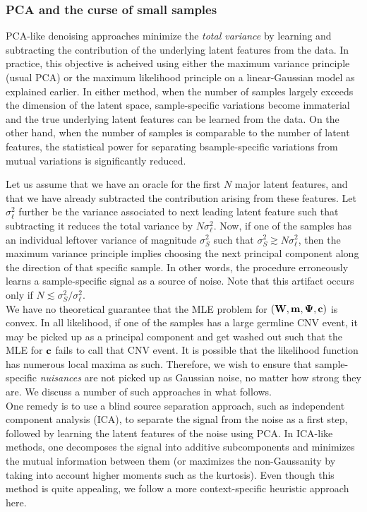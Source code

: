 \documentclass[nofootinbib,amssymb,amsmath]{revtex4}
\newcommand{\vc}{{\bf c}}
\newcommand{\vm}{{\bf m}}
\newcommand{\vW}{{\bf W}}
\newcommand{\vPsi}{{\bf \Psi}}
\begin{document}
\subsubsection{PCA and the curse of small samples}
PCA-like denoising approaches minimize the {\em total variance} by learning and subtracting the contribution of the underlying latent features from the data. In practice, this objective is acheived using either the maximum variance principle (usual PCA) or the maximum likelihood principle on a linear-Gaussian model as explained earlier. In either method, when the number of samples largely exceeds the dimension of the latent space, sample-specific variations become immaterial and the true underlying latent features can be learned from the data. On the other hand, when the number of samples is comparable to the number of latent features, the statistical power for separating bsample-specific variations from mutual variations is significantly reduced.

Let us assume that we have an oracle for the first $N$ major latent features, and that we have already subtracted the contribution arising from these features. Let $\sigma_\ell^2$ further be the variance associated to next leading latent feature such that subtracting it reduces the total variance by $N\sigma_\ell^2$. Now, if one of the samples has an individual leftover variance of magnitude $\sigma_S^2$ such that $\sigma_S^2 \gtrsim N\sigma_\ell^2$, then the maximum variance principle implies choosing the next principal component along the direction of that specific sample. In other words, the procedure erroneously learns a sample-specific signal as a source of noise. Note that this artifact occurs only if $N \lesssim \sigma_S^2 / \sigma_\ell^2$.\\

 We have no theoretical guarantee that the MLE problem for $(\vW, \vm, \vPsi, \vc)$ is convex. In all likelihood, if one of the samples has a large germline CNV event, it may be picked up as a principal component and get washed out such that the MLE for $\vc$ fails to call that CNV event. It is possible that the likelihood function has numerous local maxima as such. Therefore, we wish to ensure that sample-specific {\em nuisances} are not picked up as Gaussian noise, no matter how strong they are. We discuss a number of such approaches in what follows.\\

 One remedy is to use a blind source separation approach, such as independent component analysis (ICA), to separate the signal from the noise as a first step, followed by learning the latent features of the noise using PCA. In ICA-like methods, one decomposes the signal into additive subcomponents and minimizes the mutual information between them (or maximizes the non-Gaussanity by taking into account higher moments such as the kurtosis). Even though this method is quite appealing, we follow a more context-specific heuristic approach here.\\
\end{document}
